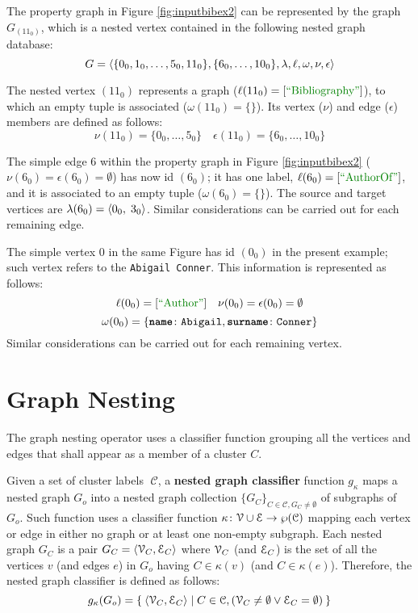\begin{example}[label=exImpl]
	The property graph in Figure \ref{fig:inputbibex2} can be represented by the graph $G_{({{11}_0})}$, which is a nested vertex contained in the following nested graph database:
	\[G=\Braket{\{0_0,1_0,\dots,5_0,11_0\}, \{6_0,\dots, 10_0\},\lambda,\ell,\omega,\nu,\epsilon}\]
	
	The nested vertex $({{11}_0})$  represents a  graph ($\ell({{11}_0})=[\mstr{Bibliography}]$), to which an empty tuple is associated ($\omega({{11}_0})=\{\}$). Its vertex ($\nu$) and edge ($\epsilon$) members are defined as follows:
	\[\nu({{11}_0})=\{{{0}_0},\dots,{{5}_0}\}\quad\epsilon({{11}_0})=\{{{6}_0},\dots,{{10}_0}\}\]
	
	The simple edge $6$ within the property graph in Figure \ref{fig:inputbibex2} ($\nu({{6}_0})=\epsilon({{6}_0})=\emptyset$) has now id $({{6}_0})$; it has one label, $\ell({{6}_0})=[\mstr{AuthorOf}]$, and it is associated to an empty tuple ($\omega({{6}_0})=\{\}$).
	The source and target vertices are 
	$\lambda({{6}_0})=\Braket{{{0}_0},\;3_0}$. Similar considerations can be carried out for each  remaining edge.
	
	The simple vertex $0$ in the same Figure has id $({{0}_0})$ in the present example; such vertex refers to the  \texttt{Abigail Conner}. This information is represented as follows:
	\[\ell({{0}_0})=[\mstr{Author}]\quad\nu({{0}_0})=\epsilon({{0}_0})=\emptyset\] \[\omega({{0}_0})=\{\texttt{\textbf{name}}\colon\texttt{Abigail},\texttt{\textbf{surname}}\colon\texttt{Conner}\}\]
	Similar considerations can be carried out for each remaining vertex.
	
\end{example}


\section{Graph Nesting}\label{sec:nestingdef}
The graph nesting operator uses a classifier function grouping all the vertices and edges that shall appear as a member of a cluster $C$. 

\begin{definition}
	Given a set of cluster labels $\;\mathcal{C}$, a \textbf{nested graph classifier} function $g_\kappa$ maps a nested graph $G_o$ into a nested  graph collection $\{G_C\}_{C\in\mathcal{C},G_C\neq \emptyset}$ of subgraphs of $G_o$. Such function uses a classifier function $\kappa\colon \mathcal{V}\cup \mathcal{E}\to \wp(\mathcal{C})$ mapping each vertex or edge in either no graph or at least one non-empty subgraph. Each nested graph $G_C$ is a pair
	$G_C=\Braket{\mathcal{V}_C,\mathcal{E}_C}$
	where $\mathcal{V}_C$ (and $\mathcal{E}_C$) is the set of all the vertices $v$ (and edges $e$) in $G_o$ having $C\in \kappa(v)$ (and $C\in \kappa(e)$). Therefore, the nested graph classifier is defined as follows:
	\[g_\kappa(G_o)=\Set{\Braket{\mathcal{V}_C,\mathcal{E}_C}|C\in\mathcal{C},(\mathcal{V}_C\neq\emptyset\vee\mathcal{E}_C=\emptyset)}\]
\end{definition}


